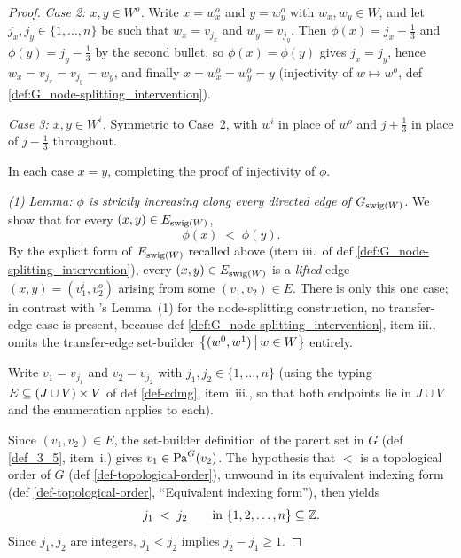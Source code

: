 \documentclass[main]{subfiles}
\begin{document}
\begin{proof}
\emph{Case 2: $x, y \in W^o$.} Write $x = w_x^o$ and $y = w_y^o$ with $w_x, w_y \in W$, and let $j_x, j_y \in \{1, \dots, n\}$ be such that $w_x = v_{j_x}$ and $w_y = v_{j_y}$. Then $\phi(x) = j_x - \tfrac{1}{3}$ and $\phi(y) = j_y - \tfrac{1}{3}$ by the second bullet, so $\phi(x) = \phi(y)$ gives $j_x = j_y$, hence $w_x = v_{j_x} = v_{j_y} = w_y$, and finally $x = w_x^o = w_y^o = y$ (injectivity of $w \mapsto w^o$, def \ref{def:G_node-splitting_intervention}).

\emph{Case 3: $x, y \in W^i$.} Symmetric to Case~2, with $w^i$ in place of $w^o$ and $j + \tfrac{1}{3}$ in place of $j - \tfrac{1}{3}$ throughout.

In each case $x = y$, completing the proof of injectivity of $\phi$.

\medskip\noindent\emph{(1) Lemma: $\phi$ is strictly increasing along every directed edge of $G_{\mathrm{swig}(W)}$.}
We show that for every $(x, y) \in E_{\mathrm{swig}(W)}$,
\[
    \phi(x) \;<\; \phi(y).
\]
By the explicit form of $E_{\mathrm{swig}(W)}$ recalled above (item iii.\ of def \ref{def:G_node-splitting_intervention}), every $(x, y) \in E_{\mathrm{swig}(W)}$ is a \emph{lifted} edge $(x, y) = (v_1^i, v_2^o)$ arising from some $(v_1, v_2) \in E$. There is only this one case; in contrast with 's Lemma~(1) for the node-splitting construction, no transfer-edge case is present, because def \ref{def:G_node-splitting_intervention}, item iii., omits the transfer-edge set-builder $\left \{ (w^0, w^1) \,\middle|\, w \in W \right \}$ entirely.

Write $v_1 = v_{j_1}$ and $v_2 = v_{j_2}$ with $j_1, j_2 \in \{1, \dots, n\}$ (using the typing $E \subseteq (J \cup V) \times V$ of def \ref{def-cdmg}, item~iii., so that both endpoints lie in $J \cup V$ and the enumeration applies to each).

Since $(v_1, v_2) \in E$, the set-builder definition of the parent set in $G$ (def \ref{def_3_5}, item~i.) gives $v_1 \in \mathrm{Pa}^G(v_2)$. The hypothesis that $<$ is a topological order of $G$ (def \ref{def-topological-order}), unwound in its equivalent indexing form (def \ref{def-topological-order}, ``Equivalent indexing form''), then yields
\[
    j_1 \;<\; j_2 \qquad \text{in } \{1, 2, \dots, n\} \subseteq \mathbb{Z}.
\]
Since $j_1, j_2$ are integers, $j_1 < j_2$ implies $j_2 - j_1 \ge 1$.


\end{proof}
\end{document}
